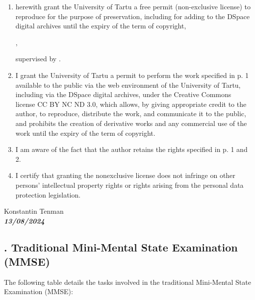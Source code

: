 \begin{enumerate}
\item
herewith grant the University of Tartu a free permit (non-exclusive license) to
reproduce for the purpose of preservation, including for adding to the DSpace digital archives until the expiry of the term of copyright,
\par
\textbf{\thesistitle}, %
\par
supervised by \supervisor. %
\item
I grant the University of Tartu a permit to perform the work specified in p. 1 available to the public via the web environment of the University of Tartu, including via the DSpace digital archives, under the Creative Commons license CC BY NC ND 3.0, which allows, by giving appropriate credit to the author, to reproduce, distribute the work, and communicate it to the public, and prohibits the creation of derivative works and any commercial use of the work until the expiry of the term of copyright.
\item
I am aware of the fact that the author retains the rights specified in p. 1 and 2.
\item
I certify that granting the nonexclusive license does not infringe on other persons' intellectual property rights or rights arising from the personal data protection legislation. 
\end{enumerate}

\noindent
Konstantin Tenman\\ %
\textbf{\textsl{13/08/2024}}

\newpage
{}

\subsection*{. Traditional Mini-Mental State Examination (MMSE)} \label{appendix:mmse}


The following table details the tasks involved in the traditional Mini-Mental State Examination (MMSE):

